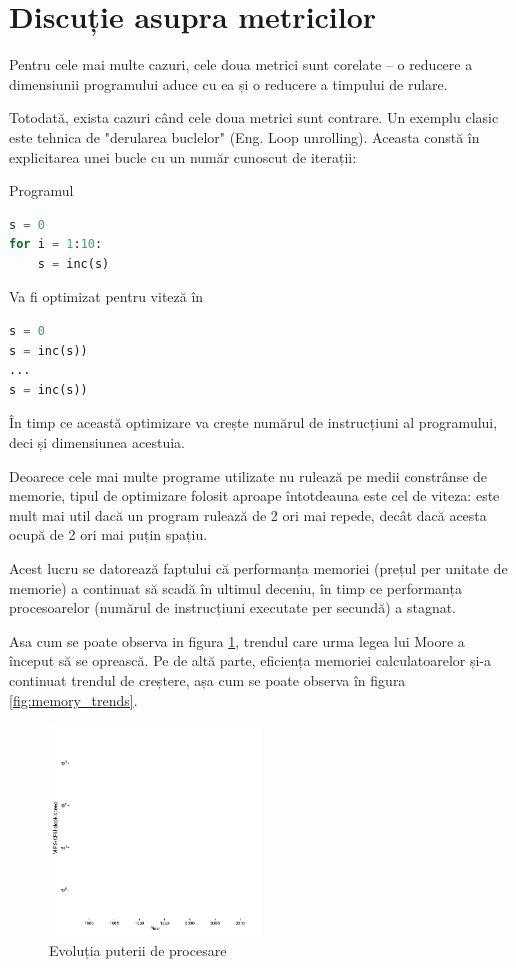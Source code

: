 \section{Discuție asupra metricilor}

Pentru cele mai multe cazuri, cele doua metrici sunt corelate --
o reducere a dimensiunii programului aduce cu ea și o reducere a timpului de rulare.

Totodată, exista cazuri când cele doua metrici sunt contrare.
Un exemplu clasic este tehnica de "derularea buclelor" (Eng. Loop
unrolling).
Aceasta constă în explicitarea unei bucle cu un număr cunoscut
de iterații:

Programul
\begin{lstlisting}[language=Python]
s = 0
for i = 1:10:
    s = inc(s)
\end{lstlisting}

Va fi optimizat pentru viteză în
\begin{lstlisting}[language=Python]
s = 0
s = inc(s))
...
s = inc(s))
\end{lstlisting}

În timp ce această optimizare va crește numărul de instrucțiuni
al programului, deci și dimensiunea acestuia.

Deoarece cele mai multe programe utilizate nu rulează pe medii
constrânse de memorie, tipul de optimizare folosit aproape
întotdeauna este cel de viteza: este mult mai util dacă un
program rulează de 2 ori mai repede, decât dacă acesta ocupă de
2 ori mai puțin spațiu.

Acest lucru se datorează faptului că performanța memoriei (prețul
per unitate de memorie) a continuat să scadă în ultimul deceniu,
în timp ce performanța procesoarelor (numărul de instrucțiuni
executate per secundă) a stagnat.

Asa cum se poate observa in figura \ref{fig:cpu_and_gpu_trends},
trendul care urma legea lui Moore \cite{moores_law} a început să
se oprească. Pe de altă parte, eficiența memoriei calculatoarelor
și-a continuat trendul de creștere, așa cum se poate observa în figura
\ref{fig:memory_trends}.

\begin{figure}
	\centering
	\includegraphics[width=0.5\textwidth]{cpu_and_gpu_trends}
	\caption{Evoluția puterii de procesare\cite{cpu_and_gpu_trends} }
	\label{fig:cpu_and_gpu_trends}
\end{figure}

